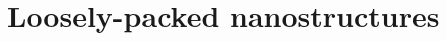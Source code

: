 \documentclass[\main/dresen_thesis.tex]{subfiles}
\begin{document}
\section{Loosely-packed nanostructures}
\end{document}
